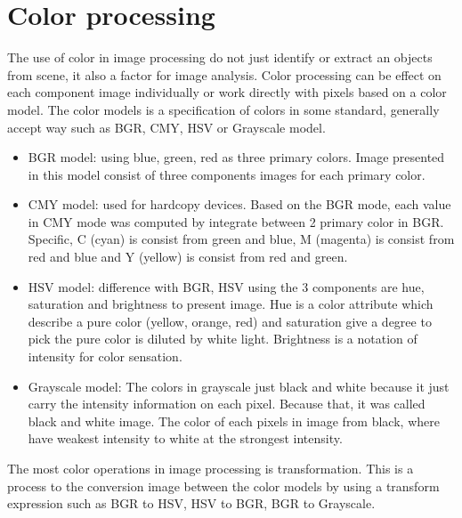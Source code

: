 \section{Color processing}\label{color_model}
The use of color in image processing do not just identify or extract an objects from scene, it also a factor for image analysis. Color processing can be effect on each component image individually or work directly with pixels based on a color model. The color models is a specification of colors in some standard, generally accept way such as BGR, CMY, HSV or Grayscale model.
\begin{itemize}
\item BGR model: using blue, green, red as three primary colors. Image presented in this model consist of three components images for each primary color.
\item CMY model: used for hardcopy devices. Based on the BGR mode, each value in CMY mode was computed by integrate between 2 primary color in BGR. Specific, C (cyan) is consist from green and blue, M (magenta) is consist from red and blue and Y (yellow) is consist from red and green.
\item HSV model: difference with BGR, HSV using the 3 components are hue, saturation and brightness to present image. Hue is a color attribute which describe a pure color (yellow, orange, red) and saturation give a degree to pick the pure color is diluted by white light. Brightness is a notation of intensity for color sensation.
\item Grayscale model: The colors in grayscale just black and white because it just carry the intensity information on each pixel. Because that, it was called black and white image. The color of each pixels in image from black, where have weakest intensity to white at the strongest intensity.
\end{itemize}
The most color operations in image processing is transformation. This is a process to the conversion image between the color models by using a transform expression such as BGR to HSV, HSV to BGR, BGR to Grayscale.
